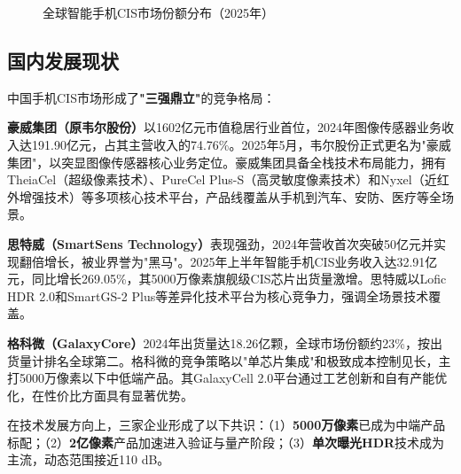 \documentclass[12pt, a4paper]{ctexart}
\begin{document}
\begin{figure}[H]
\centering
{}
\caption{全球智能手机CIS市场份额分布（2025年）\cite{statsmarket2026}}
\label{fig:market_share}
\end{figure}

\subsection{国内发展现状}

中国手机CIS市场形成了\textbf{"三强鼎立"}的竞争格局\cite{qqCIS2025}：

\textbf{豪威集团（原韦尔股份）}以1602亿元市值稳居行业首位，2024年图像传感器业务收入达191.90亿元，占其主营收入的74.76\%。2025年5月，韦尔股份正式更名为"豪威集团"，以突显图像传感器核心业务定位\cite{sensorexpert2025}。豪威集团具备全栈技术布局能力，拥有TheiaCel（超级像素技术）、PureCel Plus-S（高灵敏度像素技术）和Nyxel（近红外增强技术）等多项核心技术平台，产品线覆盖从手机到汽车、安防、医疗等全场景\cite{laoyaoba2025}。

\textbf{思特威（SmartSens Technology）}表现强劲，2024年营收首次突破50亿元并实现翻倍增长，被业界誉为"黑马"。2025年上半年智能手机CIS业务收入达32.91亿元，同比增长269.05\%，其5000万像素旗舰级CIS芯片出货量激增\cite{qqCIS2025}。思特威以Lofic HDR 2.0和SmartGS-2 Plus等差异化技术平台为核心竞争力，强调全场景技术覆盖\cite{laoyaoba2025}。

\textbf{格科微（GalaxyCore）}2024年出货量达18.26亿颗，全球市场份额约23\%，按出货量计排名全球第二\cite{qqCIS2025}。格科微的竞争策略以"单芯片集成"和极致成本控制见长，主打5000万像素以下中低端产品。其GalaxyCell 2.0平台通过工艺创新和自有产能优化，在性价比方面具有显著优势\cite{laoyaoba2025}。

在技术发展方向上，三家企业形成了以下共识\cite{laoyaoba2025}：（1）\textbf{5000万像素}已成为中端产品标配；（2）\textbf{2亿像素}产品加速进入验证与量产阶段；（3）\textbf{单次曝光HDR}技术成为主流，动态范围接近110 dB。
\end{document}
